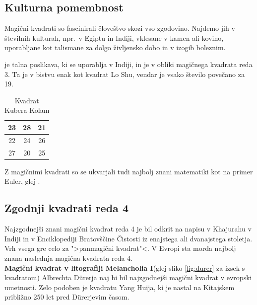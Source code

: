 \documentclass[a4paper,12pt]{article}
\theoremstyle{definition}
\theoremstyle{plain}
\newcommand{\pojem}[1]{\emph{\color{purple}{#1}}}
\newenvironment{magic}[3]
   {\begin{table}[!ht]
      \caption{#2}
      \label{#3}
      \centering
      \begin{tabular}{|*{#1}{c|}}
      \hline}
   {\end{tabular}\end{table}}
\begin{document}
\subsection{Kulturna pomembnost}

Magični kvadrati so fascinirali človeštvo skozi vso zgodovino. Najdemo jih
v številnih kulturah, npr.\ v Egiptu in Indiji, vklesane v kamen ali
kovino, uporabljane kot talismane za dolgo življensko dobo in v
izogib boleznim.

\pojem{Kubera-Kolam} je talna poslikava, ki se uporablja v Indiji, in je v
obliki magičnega kvadrata reda 3. Ta je v bistvu enak kot kvadrat
Lo Shu, vendar je vsako število povečano za 19.

   \begin{magic}{3}{Kvadrat Kubera-Kolam}{table:kubera}
      23 & 28 & 21 \\\hline
      22 & 24 & 26 \\\hline
      27 & 20 & 25 \\\hline
   \end{magic}

Z magičnimi kvadrati so se ukvarjali tudi najbolj znani matematiki kot na
primer Euler, glej \cite{euler}. %


\subsection{Zgodnji kvadrati reda 4}

Najzgodnejši znani magični kvadrat reda 4 je bil odkrit na napisu
v Khajurahu v Indiji in v Enciklopediji Bratovščine Čistosti iz enajstega
ali dvanajstega stoletja. Vrh vsega gre celo za ">panmagični kvadrat"<.
V Evropi sta morda najbolj znana naslednja magična kvadrata reda 4.\\

\textbf{Magični kvadrat v litografiji Melancholia I}\quad(glej sliko \ref{fig:durer}
za izsek s kvadratom) Albrechta Dürerja naj bi bil najzgodnejši magični kvadrat
v evropski umetnosti. Zelo podoben je kvadratu Yang Huija, ki je nastal na Kitajskem
približno 250 let pred Dürerjevim časom. %
\end{document}
